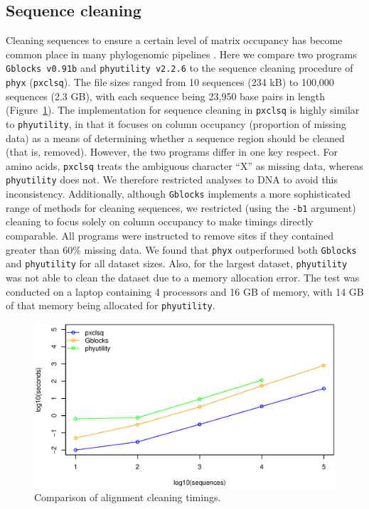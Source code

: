 \documentclass{article}
\begin{document}
\subsection{Sequence cleaning}
Cleaning sequences to ensure a certain level of matrix occupancy has become common place in many phylogenomic pipelines \citep{Dunn2013,YangSmith2014}. Here we compare two programs \texttt{Gblocks v0.91b} \citep{Gblocks} and \texttt{phyutility v2.2.6} \citep{SmithDunn2008} to the sequence cleaning procedure of \texttt{phyx} (\texttt{pxclsq}). The file sizes ranged from 10 sequences (234 kB) to 100,000 sequences (2.3 GB), with each sequence being 23,950 base pairs in length (Figure~\ref{fig:S1}). The implementation for sequence cleaning in \texttt{pxclsq} is highly similar to \texttt{phyutility}, in that it focuses on column occupancy (proportion of missing data) as a means of determining whether a sequence region should be cleaned (that is, removed). However, the two programs differ in one key respect. For amino acids,  \texttt{pxclsq} treats the ambiguous character ``X'' as missing data, whereas \texttt{phyutility} does not. We therefore restricted analyses to DNA to avoid this inconsistency. Additionally, although \texttt{Gblocks} implements a more sophisticated range of methods for cleaning sequences, we restricted (using the \texttt{-b1} argument) cleaning to focus solely on column occupancy to make timings directly comparable. All programs were instructed to remove sites if they contained greater than 60\% missing data. We found that \texttt{phyx} outperformed both \texttt{Gblocks} and \texttt{phyutility} for all dataset sizes. Also, for the largest dataset, \texttt{phyutility} was not able to clean the dataset due to a memory allocation error. The test was conducted on a laptop  containing 4 processors and 16 GB of memory, with 14 GB of that memory being allocated for \texttt{phyutility}.

\begin{figure}[!htbp]
    \centering
    \includegraphics[width=5.0in]{clsq.eps}
    \caption{Comparison of alignment cleaning timings.}
    \label{cleaningfigure}
\label{fig:S1}
\end{figure}
\end{document}
